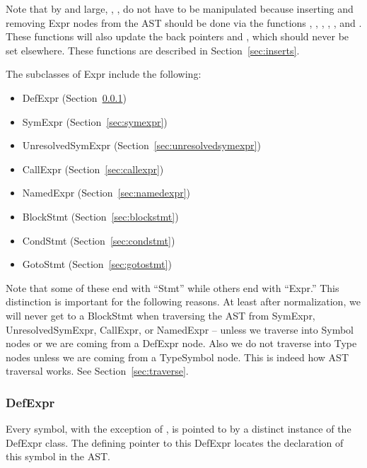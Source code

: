 \documentclass[10pt]{article}
\begin{document}
Note that by and large, , ,  do not have to
be manipulated because inserting and removing Expr nodes from the AST
should be done via the functions , ,
, , , and .
These functions will also update the back pointers  and
, which should never be set elsewhere.  These
functions are described in Section~\ref{sec:inserts}.

The subclasses of Expr include the following:
\begin{itemize}
\item DefExpr (Section~\ref{sec:defexpr})
\item SymExpr (Section~\ref{sec:symexpr})
\item UnresolvedSymExpr (Section~\ref{sec:unresolvedsymexpr})
\item CallExpr (Section~\ref{sec:callexpr})
\item NamedExpr (Section~\ref{sec:namedexpr})
\item BlockStmt (Section~\ref{sec:blockstmt})
\item CondStmt (Section~\ref{sec:condstmt})
\item GotoStmt (Section~\ref{sec:gotostmt})
\end{itemize}

Note that some of these end with ``Stmt'' while others end with
``Expr.''  This distinction is important for the following reasons.
At least after
normalization, we will never get to a BlockStmt when traversing the
AST from SymExpr, UnresolvedSymExpr, CallExpr, or NamedExpr --
unless we traverse into Symbol nodes or we are coming from a DefExpr
node. Also we do not traverse into Type nodes unless we are coming from
a TypeSymbol node.  This is indeed how AST traversal works.  See
Section~\ref{sec:traverse}.

\subsubsection{DefExpr}
\label{sec:defexpr}

Every symbol, with the exception of , is pointed to by
a distinct instance of the DefExpr class.  The defining pointer to this
DefExpr locates the declaration of this symbol in the AST.
\end{document}
